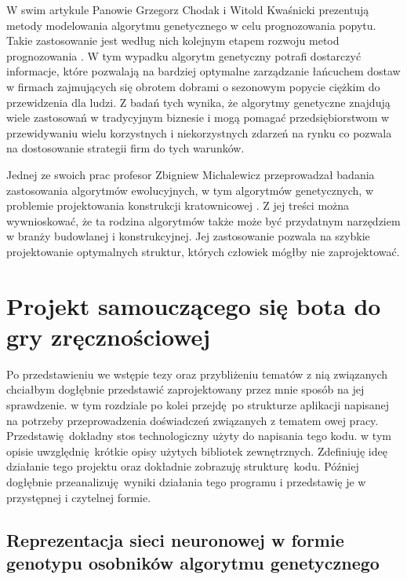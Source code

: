 \documentclass[12pt, oneside, a4paper]{report}
\begin{document}
W swim artykule Panowie Grzegorz Chodak i Witold Kwaśnicki prezentują metody modelowania algorytmu genetycznego w celu prognozowania popytu. Takie zastosowanie jest według nich kolejnym etapem rozwoju metod prognozowania \citep{chodak2002zastosowanie}. W tym wypadku algorytm genetyczny potrafi dostarczyć informacje, które pozwalają na bardziej optymalne zarządzanie łańcuchem dostaw w firmach zajmujących się obrotem dobrami o sezonowym popycie ciężkim do przewidzenia dla ludzi. Z badań tych wynika, że algorytmy genetyczne znajdują wiele zastosowań w tradycyjnym biznesie i mogą pomagać przedsiębiorstwom w przewidywaniu wielu korzystnych i niekorzystnych zdarzeń na rynku co pozwala na dostosowanie strategii firm do tych warunków.

Jednej ze swoich prac profesor Zbigniew Michalewicz przeprowadzał badania zastosowania algorytmów ewolucyjnych, w tym algorytmów genetycznych, w problemie projektowania konstrukcji kratownicowej \citep{michalewicz1996evolutionary}. Z jej treści można wywnioskować, że ta rodzina algorytmów także może być przydatnym narzędziem w branży budowlanej i konstrukcyjnej. Jej zastosowanie pozwala na szybkie projektowanie optymalnych struktur, których człowiek mógłby nie zaprojektować.  


\chapter{Projekt samouczącego się bota do gry zręcznościowej}

Po przedstawieniu we wstępie tezy oraz przybliżeniu tematów z nią związanych chciałbym dogłębnie przedstawić zaprojektowany przez mnie sposób na jej sprawdzenie. w tym rozdziale po kolei przejdę po strukturze aplikacji napisanej na potrzeby przeprowadzenia doświadczeń związanych z tematem owej pracy. Przedstawię dokładny stos technologiczny użyty do napisania tego kodu. w tym opisie uwzględnię krótkie opisy użytych bibliotek zewnętrznych. Zdefiniuję ideę działanie tego projektu oraz dokładnie zobrazuję strukturę kodu. Później dogłębnie przeanalizuję wyniki działania tego programu i przedstawię je w przystępnej i czytelnej formie.

\section{Reprezentacja sieci neuronowej w formie genotypu osobników algorytmu genetycznego}
\end{document}

